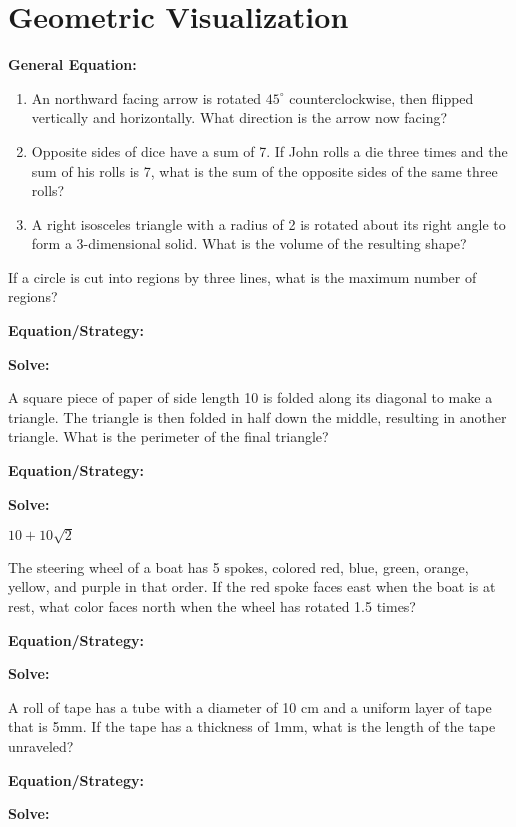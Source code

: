 \section{Geometric Visualization}

\textbf{General Equation:}

\vfill
\begin{enumerate}[labelindent=*,style=multiline,leftmargin=*,label=\textbf{Example \arabic*:}]
\item An northward facing arrow is rotated $45^\circ$ counterclockwise, then flipped vertically and horizontally. What direction is the arrow now facing?
\vfill\item Opposite sides of dice have a sum of 7. If John rolls a die three times and the sum of his rolls is 7, what is the sum of the opposite sides of the same three rolls?
\vfill\item A right isosceles triangle with a radius of 2 is rotated about its right angle to form a 3-dimensional solid. What is the volume of the resulting shape?
\end{enumerate}

\vfill
\newpage
\begin{multicols*}{2}
\begin{outline}[enumerate]
\medium

\1 If a circle is cut into regions by three lines, what is the maximum number of regions?

\bigskip
\textbf{Equation/Strategy:} \hrulefill

\bigskip
\textbf{Solve:}

\vfill
\2 
\2 
\2 
\2 
\2 

\midline

\1 A square piece of paper of side length 10 is folded along its diagonal to make a triangle. The triangle is then folded in half down the middle, resulting in another triangle. What is the perimeter of the final triangle?

\bigskip
\textbf{Equation/Strategy:} \hrulefill

\bigskip
\textbf{Solve:}

\vfill
\2 
\2 $10+10\sqrt{2}$
\2 
\2 
\2 

\columnbreak
\advanced

\1 The steering wheel of a boat has 5 spokes, colored red, blue, green, orange, yellow, and purple in that order. If the red spoke faces east when the boat is at rest, what color faces north when the wheel has rotated 1.5 times?

\bigskip
\textbf{Equation/Strategy:} \hrulefill

\bigskip
\textbf{Solve:}

\vfill
\2 
\2 
\2 
\2 
\2 

\midline

\1 A roll of tape has a tube with a diameter of 10 cm and a uniform layer of tape that is 5mm. If the tape has a thickness of 1mm, what is the length of the tape unraveled?

\bigskip
\textbf{Equation/Strategy:}

\bigskip
\textbf{Solve:}

\vfill
\2
\2
\2
\2
\2
\end{outline}
\end{multicols*}